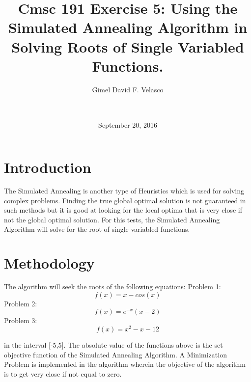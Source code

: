 \documentclass{acm_proc_article-sp}
\begin{document}
\title{Cmsc 191 Exercise 5: Using the Simulated Annealing Algorithm in Solving Roots of Single Variabled Functions.}

\author{
\alignauthor
    Gimel David F. Velasco\\
    \\
    \\
}

\date{September 20, 2016}

\maketitle


\section{Introduction}
The Simulated Annealing is another type of Heuristics which is used for solving complex problems. Finding the true global optimal solution is not guaranteed in such methods but it is good at looking for the local optima that is very close if not the global optimal solution. For this tests, the Simulated Annealing Algorithm will solve for the root of single variabled functions.

\section{Methodology}
The algorithm will seek the roots of the following equations:
Problem 1:
\begin{equation}
f(x) = x - cos(x)
\end{equation}
Problem 2:
\begin{equation}
f(x) = e^{-x}(x-2)
\end{equation}
Problem 3:
\begin{equation}
f(x) = x^2 - x - 12
\end{equation}

in the interval [-5,5]. The absolute value of the functions above is the set objective function of the Simulated Annealing Algorithm. A Minimization Problem is implemented in the algorithm wherein the objective of the algorithm is to get very close if not equal to zero.
\end{document}
